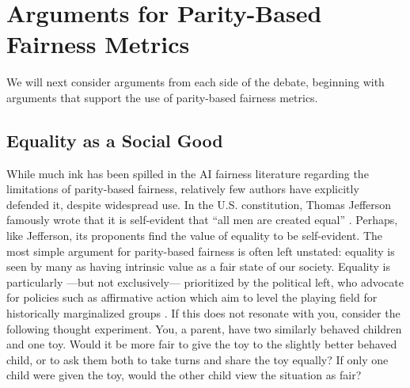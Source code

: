 \documentclass[11pt,dvipdfm]{article}
\begin{document}



\section{Arguments for Parity-Based Fairness Metrics}
\label{sec:forParity}
We will next consider arguments from each side of the debate, beginning with arguments that support the use of parity-based fairness metrics.

\subsection{Equality as a Social Good}
While much ink has been spilled in the AI fairness literature regarding the limitations of parity-based fairness, relatively few authors have explicitly defended it, despite widespread use.   In the U.S. constitution, Thomas Jefferson famously wrote that it is self-evident that ``all men are created equal'' \cite{constitution}. Perhaps, like Jefferson, its proponents find the value of equality to be self-evident.  The most simple argument for parity-based fairness is often left unstated: equality is seen by many as having intrinsic value as a fair state of our society.  Equality is particularly ---but not exclusively--- prioritized by the political left, who advocate for policies such as affirmative action which aim to level the playing field for historically marginalized groups \cite{dionne2004americans}.  If this does not resonate with you, consider the following thought experiment.  You, a parent, have two similarly behaved children and one toy.  Would it be more fair to give the toy to the slightly better behaved child, or to ask them both to take turns and share the toy equally?  If only one child were given the toy, would the other child view the situation as fair?
\end{document}
